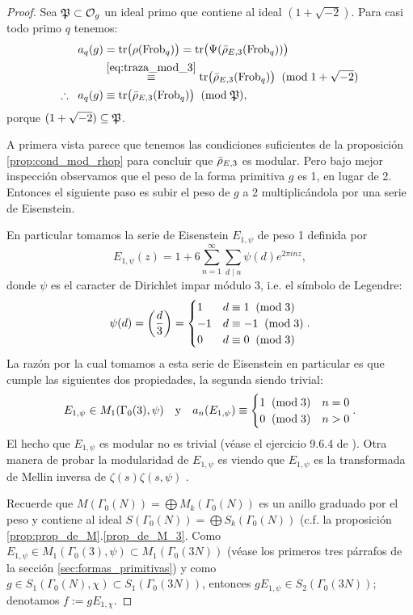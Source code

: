 \begin{proof}
  Sea $\mathfrak{P}\subset\mathcal{O}_g$ un ideal primo que contiene al ideal $(1+\sqrt{-2})$. Para casi todo primo $q$ tenemos:
  \begin{align}
    a_q(g)
    &=\mathrm{tr}\big(\rho(\mathrm{Frob}_q)\big)=\mathrm{tr}\big(\Psi(\bar{\rho}_{E,3}(\mathrm{Frob}_q))\big)\nonumber\\
    &\overset{\ref{eq:traza_mod_3}}{\equiv}
      \mathrm{tr}\big(\bar{\rho}_{E,3}(\mathrm{Frob}_q)\big) \;\;(\mathrm{mod}\; 1+\sqrt{-2})\nonumber\\
    \therefore\;\; a_q(g)
    &\equiv\mathrm{tr}\big(\bar{\rho}_{E,3}(\mathrm{Frob}_q)\big) \;\;(\mathrm{mod}\; \mathfrak{P}),\label{eq:cong_coef_fourier}
  \end{align}
  porque $(1+\sqrt{-2})\subseteq\mathfrak{P}$.


  A primera vista parece que tenemos las condiciones suficientes de la proposici\'on \ref{prop:cond_mod_rhop} para concluir que $\bar{\rho}_{E,3}$ es modular. Pero bajo mejor inspecci\'on observamos que el peso de la forma primitiva $g$ es 1, en lugar de 2. Entonces el siguiente paso es subir el peso de $g$ a 2 multiplic\'andola por una serie de Eisenstein.

En particular tomamos la serie de Eisenstein $E_{1,\psi}$ de peso 1 definida por
  \[
    E_{1,\psi}(z)=1+6\sum_{n=1}^{\infty}\sum_{d\mid n}\psi(d)e^{2\pi inz},
  \]
donde $\psi$ es el caracter de Dirichlet impar m\'odulo 3, i.e. el s\'imbolo de Legendre:
  \[
    \psi(d)=\left( \frac{d}{3} \right)=
    \begin{cases}
      1 &d\equiv1\;\;(\mathrm{mod}\; 3)\\
      -1&d\equiv -1\;\;(\mathrm{mod}\; 3)\\
      0&d\equiv0\;\;(\mathrm{mod}\; 3)
    \end{cases}.
  \]
  La raz\'on por la cual tomamos a esta serie de Eisenstein en particular es que cumple las siguientes dos propiedades, la segunda siendo trivial:
  \begin{equation}
    \label{eq:prop_eisenstein_peso1}
    E_{1,\psi}\in M_1(\Gamma_0(3),\psi)
    \quad\mathrm{y}\quad a_n(E_{1,\psi})\equiv
    \begin{cases}
        1 \;\;(\mathrm{mod}\; 3) & n=0\\
        0 \;\;(\mathrm{mod}\; 3) & n>0
      \end{cases}.
    \end{equation}
    El hecho que $E_{1,\psi}$ es modular no es trivial (v\'ease el ejercicio 9.6.4 de \cite{DiamondShurmanAFCIMF}). Otra manera de probar la modularidad de $E_{1,\psi}$ es viendo que $E_{1,\psi}$ es la transformada de Mellin inversa de $\zeta(s)\zeta(s,\psi)$ \cite{Wiles}.%
    
    Recuerde que $M(\Gamma_0(N))=\bigoplus M_k(\Gamma_0(N))$ es un anillo graduado por el peso y contiene al ideal $S(\Gamma_0(N))=\bigoplus S_k(\Gamma_0(N))$ (c.f. la proposici\'on \ref{prop:prop_de_M}.\ref{prop_de_M_3}. Como $E_{1,\psi}\in M_1(\Gamma_0(3),\psi)\subset M_1(\Gamma_0(3N))$ (v\'ease los primeros tres p\'arrafos de la secci\'on \ref{sec:formas_primitivas}) y como $g\in S_1(\Gamma_0(N),\chi)\subset S_1(\Gamma_0(3N))$, entonces $gE_{1,\psi}\in S_2(\Gamma_0(3N))$; denotamos $f:=gE_{1,\chi}$.
    

\end{proof}
